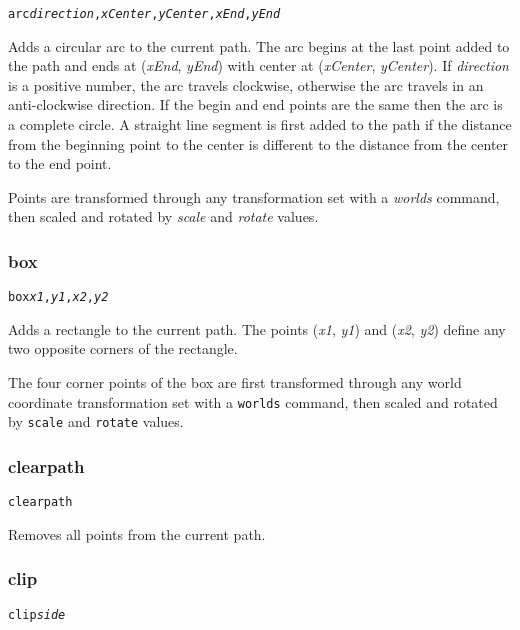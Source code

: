 \begin{alltt}
arc \textit{direction}, \textit{xCenter}, \textit{yCenter}, \textit{xEnd}, \textit{yEnd}
\end{alltt}

Adds a circular arc to the current path.  The arc begins at
the last point added to the path and ends at (\textit{xEnd}, \textit{yEnd})
with center at (\textit{xCenter}, \textit{yCenter}).
If \textit{direction} is a positive number, the arc travels clockwise,
otherwise the arc travels in an anti-clockwise direction.
If the begin and end points are the same then the arc is a complete circle.
A straight line segment is first added to the path if
the distance from the beginning point to the center is different
to the distance from the center to the end point.

Points are transformed through any
transformation set with a \textit{worlds} command,
then scaled and rotated by \textit{scale}
and \textit{rotate} values.

\subsubsection{box}

\begin{alltt}
box \textit{x1}, \textit{y1}, \textit{x2}, \textit{y2}
\end{alltt}

Adds a rectangle to the current path.
The points
(\textit{x1}, \textit{y1}) and (\textit{x2}, \textit{y2}) define
any two opposite corners of the rectangle.

The four corner points of the box
are first transformed through any world coordinate
transformation set with a \texttt{worlds} command,
then scaled and rotated by \texttt{scale}
and \texttt{rotate} values.

\subsubsection{clearpath}

\begin{alltt}
clearpath
\end{alltt}

Removes all points from the current path.

\subsubsection{clip}

\begin{alltt}
clip \textit{side}
\end{alltt}

